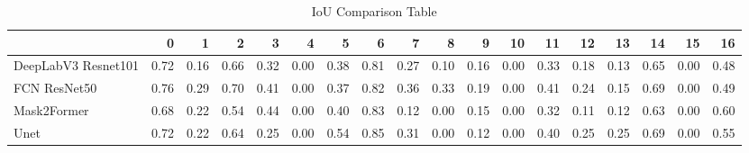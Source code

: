\begin{table}
\centering
\caption{IoU Comparison Table}
\label{tab:iou_comparison}
\begin{tabular}{lrrrrrrrrrrrrrrrrr}
\toprule
{} &    0 &    1 &    2 &    3 &    4 &    5 &    6 &    7 &    8 &    9 &   10 &   11 &   12 &   13 &   14 &   15 &   16 \\
\midrule
DeepLabV3 Resnet101 & 0.72 & 0.16 & 0.66 & 0.32 & 0.00 & 0.38 & 0.81 & 0.27 & 0.10 & 0.16 & 0.00 & 0.33 & 0.18 & 0.13 & 0.65 & 0.00 & 0.48 \\
FCN ResNet50        & 0.76 & 0.29 & 0.70 & 0.41 & 0.00 & 0.37 & 0.82 & 0.36 & 0.33 & 0.19 & 0.00 & 0.41 & 0.24 & 0.15 & 0.69 & 0.00 & 0.49 \\
Mask2Former         & 0.68 & 0.22 & 0.54 & 0.44 & 0.00 & 0.40 & 0.83 & 0.12 & 0.00 & 0.15 & 0.00 & 0.32 & 0.11 & 0.12 & 0.63 & 0.00 & 0.60 \\
Unet                & 0.72 & 0.22 & 0.64 & 0.25 & 0.00 & 0.54 & 0.85 & 0.31 & 0.00 & 0.12 & 0.00 & 0.40 & 0.25 & 0.25 & 0.69 & 0.00 & 0.55 \\
\bottomrule
\end{tabular}
\end{table}
